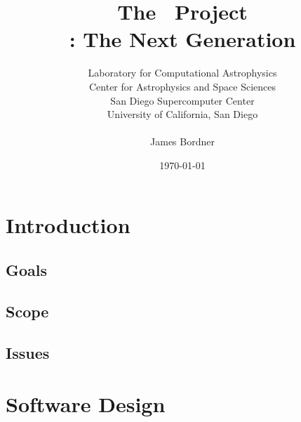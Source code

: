 \documentclass{beamer}
\title[The \cello\ Project]
      {The \cello\ Project \\ \small{\enzo: The Next Generation}}
\author[James Bordner]{\small Laboratory for Computational Astrophysics \\ Center for Astrophysics and Space Sciences \\San Diego Supercomputer Center \\ University of California, San Diego \\ \ \\ James Bordner}
\date{\today}
\begin{document}
\frame{\titlepage}


\section{Introduction}

% 

\subsection{Goals}



\subsection{Scope}




\subsection{Issues}



\section{Software Design}
\end{document}
